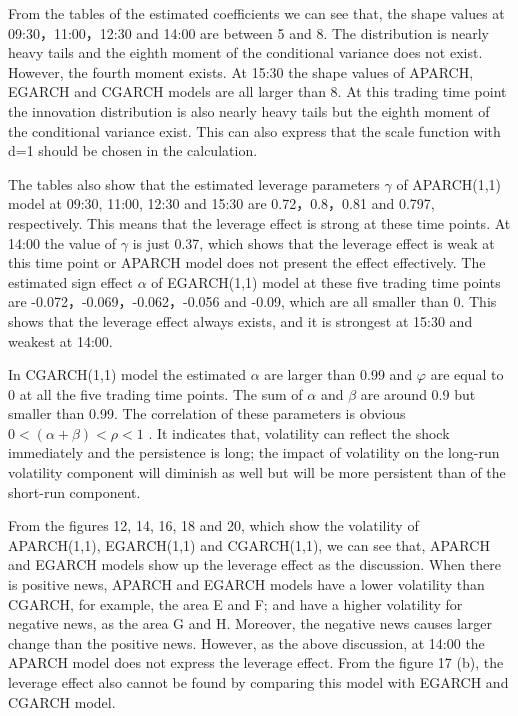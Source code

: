 From the tables of the estimated coefficients we can see that, the shape values at 09:30，11:00，12:30 and 14:00 are between 5 and 8. The distribution is nearly heavy tails and the eighth moment of the conditional variance does not exist. However, the fourth moment exists. At 15:30 the shape values of APARCH, EGARCH and CGARCH models are all larger than 8. At this trading time point the innovation distribution is also nearly heavy tails but the eighth moment of the conditional variance exist. This can also express that the scale function with d=1 should be chosen in the calculation.

The tables also show that the estimated leverage parameters $\gamma$  of APARCH(1,1) model at 09:30, 11:00, 12:30 and 15:30 are 0.72，0.8，0.81 and 0.797, respectively. This means that the leverage effect is strong at these time points. At 14:00 the value of $\gamma$  is just 0.37, which shows that the leverage effect is weak at this time point or APARCH model does not present the effect effectively. The estimated sign effect $\alpha$  of EGARCH(1,1) model at these five trading time points are -0.072，-0.069，-0.062，-0.056 and -0.09, which are all smaller than 0. This shows that the leverage effect always exists, and it is strongest at 15:30 and weakest at 14:00.

In CGARCH(1,1) model the estimated $\alpha$  are larger than 0.99 and $\varphi$  are equal to 0 at all the five trading time points. The sum of  $\alpha$  and $\beta$ are around 0.9 but smaller than 0.99. The correlation of these parameters is obvious  $0 < (\alpha + \beta) < \rho <1$ . It indicates that, volatility can reflect the shock immediately and the persistence is long; the impact of volatility on the long-run volatility component will diminish as well but will be more persistent than of the short-run component.

From the figures 12, 14, 16, 18 and 20, which show the volatility of APARCH(1,1), EGARCH(1,1) and CGARCH(1,1), we can see that, APARCH and EGARCH models show up the leverage effect as the discussion. When there is positive news, APARCH and EGARCH models have a lower volatility than CGARCH, for example, the area E and F; and have a higher volatility for negative news, as the area G and H. Moreover, the negative news causes larger change than the positive news. However, as the above discussion, at 14:00 the APARCH model does not express the leverage effect. From the figure 17 (b), the leverage effect also cannot be found by comparing this model with EGARCH and CGARCH model.

